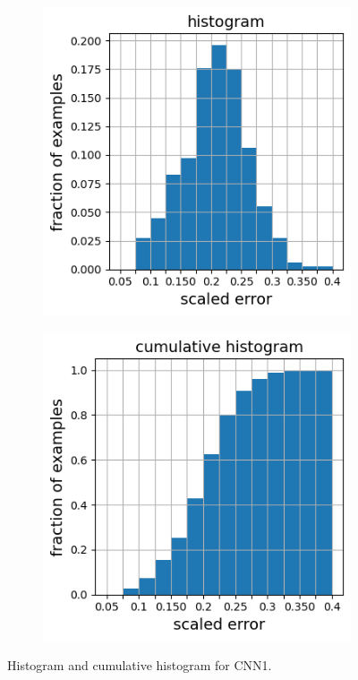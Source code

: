 \documentclass[10pt]{article}
\newcommand{\nhghalfwidth}{0.48\linewidth}
\newcommand{\nhgtotalheight}{4cm}
\begin{document}
\begin{figure}[!h]
\captionsetup[subfigure]{justification=centering}
  \centering
  \begin{subfigure}[c]{\nhghalfwidth}
    \centering
    \includegraphics[totalheight=\nhgtotalheight]{Figures/Results1/histogram.png}
  \end{subfigure}
%  
  \begin{subfigure}[c]{\nhghalfwidth}
    \centering
    \includegraphics[totalheight=\nhgtotalheight]{Figures/Results1/cumulative.png}
  \end{subfigure}
  \caption{\label{fig:cnn1histo} Histogram and cumulative histogram for CNN1.}
\end{figure}
%
\end{document}
